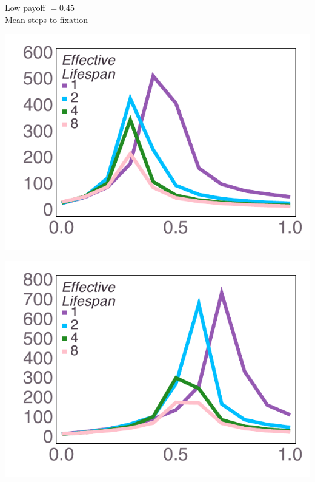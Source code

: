 \documentclass[varwidth=true,crop=false]{standalone}
\begin{document}
    \begin{minipage}{3.75in}
    \begin{rotate}{90}
      {\parbox{3.0in}{
          \centering
          \vspace{-1.0em}\hspace{-2.5em} {\huge Low payoff $ = 0.45$} \\[1em]
          {\huge Mean steps to fixation}
      }}
    \end{rotate}%
    \hspace{2em}
      \includegraphics[width=\textwidth]{Figures/step_over_u_lowpayoff=0.45_nbehaviors=2.pdf}
	\end{minipage}\noindent\hspace{1.25em}
	\begin{minipage}{3.75in}%
      \includegraphics[width=\textwidth]{Figures/step_over_u_lowpayoff=0.45_nbehaviors=4.pdf}
    \end{minipage}\noindent
\end{document}
